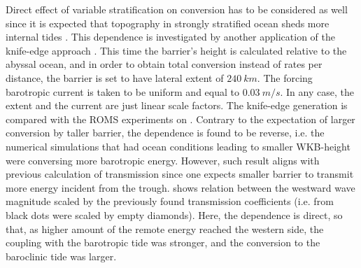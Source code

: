 \documentclass[12pt]{article}
\begin{document}
Direct effect of variable stratification on conversion has to be considered as well since it is 
expected that topography in strongly stratified ocean sheds more internal tides 
\citep{holloway1999internal}. This dependence is investigated by another application of the 
knife-edge approach \citep{st2003generation}. This time the barrier's height is calculated 
relative to the abyssal ocean, and in order to obtain total conversion instead of rates per 
distance, the barrier is set to have  
lateral extent of $240~km$. The forcing barotropic current is taken to be uniform and equal to 
$0.03~m/s$. In any case, the extent and the current are just linear scale factors. The knife-edge 
generation is compared with the ROMS 
experiments on . Contrary to the expectation of larger conversion by 
taller barrier, the dependence is found to be reverse, i.e. the numerical simulations that had 
ocean conditions leading to smaller WKB-height were 
conversing more barotropic energy. However, such result aligns with previous calculation of 
transmission since one expects smaller barrier to transmit more energy incident from the 
trough.  shows 
relation between the westward wave magnitude scaled by the previously found transmission 
coefficients (i.e. from  black dots were scaled by empty diamonds). 
Here, the dependence is direct, so that, as higher amount of the remote energy reached the western 
side, the coupling with the barotropic tide was stronger, and the conversion to the baroclinic tide 
was larger.\\
\end{document}
